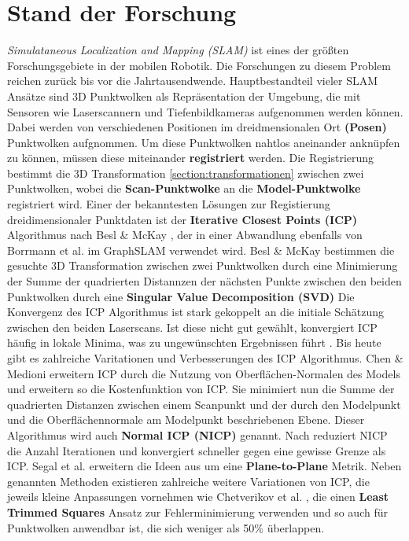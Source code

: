 \chapter{Stand der Forschung}\label{chapter:sdf}


\textit{Simulataneous Localization and Mapping (SLAM)} ist eines der größten Forschungsgebiete in der mobilen Robotik.
Die Forschungen zu diesem Problem reichen zurück bis vor die Jahrtausendwende.
Hauptbestandteil vieler SLAM Ansätze sind 3D Punktwolken als Repräsentation der Umgebung, die mit Sensoren wie Laserscannern und Tiefenbildkameras aufgenommen werden können.
Dabei werden von verschiedenen Positionen im dreidmensionalen Ort \textbf{(Posen)} Punktwolken aufgnommen. Um diese Punktwolken nahtlos aneinander anknüpfen zu können, müssen diese miteinander \textbf{registriert} werden. Die Registrierung bestimmt die 3D Transformation \ref{section:transformationen} zwischen zwei Punktwolken, wobei die \textbf{Scan-Punktwolke} an die \textbf{Model-Punktwolke} registriert wird.
Einer der bekanntesten Lösungen zur Registierung dreidimensionaler Punktdaten ist der \textbf{Iterative Closest Points (ICP)} Algorithmus nach Besl \& McKay \cite{besl1992method}, der in einer Abwandlung ebenfalls von Borrmann et al. im GraphSLAM \cite{borrmann2008globally} verwendet wird.
Besl \& McKay \cite{besl1992method} bestimmen die gesuchte 3D Transformation zwischen zwei Punktwolken durch eine Minimierung der Summe der quadrierten Distannzen der nächsten Punkte zwischen den beiden Punktwolken durch eine \textbf{Singular Value Decomposition (SVD)}
Die Konvergenz des ICP Algorithmus ist stark gekoppelt an die initiale Schätzung zwischen den beiden Laserscans. Ist diese nicht gut gewählt, konvergiert ICP häufig in lokale Minima, was zu ungewünschten Ergebnissen führt \cite{he2017iterative}. 
Bis heute gibt es zahlreiche Varitationen und Verbesserungen des ICP Algorithmus.
Chen \& Medioni \cite{chen1992object} erweitern ICP durch die Nutzung von Oberflächen-Normalen des Models und erweitern so die Kostenfunktion von ICP. Sie minimiert nun die Summe der quadrierten Distanzen zwischen einem Scanpunkt und der durch den Modelpunkt und die Oberflächennormale am Modelpunkt beschriebenen Ebene. Dieser Algorithmus wird auch \textbf{Normal ICP (NICP)} genannt. 
Nach \cite{he2017iterative} reduziert NICP die Anzahl Iterationen und konvergiert schneller  gegen eine gewisse Grenze als ICP.
Segal et al. \cite{segal2009generalized} erweitern die Ideen aus \cite{chen1992object} um eine \textbf{Plane-to-Plane} Metrik.
Neben genannten Methoden existieren zahlreiche weitere Variationen von ICP, die jeweils kleine Anpassungen vornehmen wie Chetverikov et al. \cite{chetverikov2005robust}, die einen \textbf{Least Trimmed Squares} Ansatz zur Fehlerminimierung verwenden und so auch für Punktwolken anwendbar ist, die sich weniger als 50\% überlappen.

